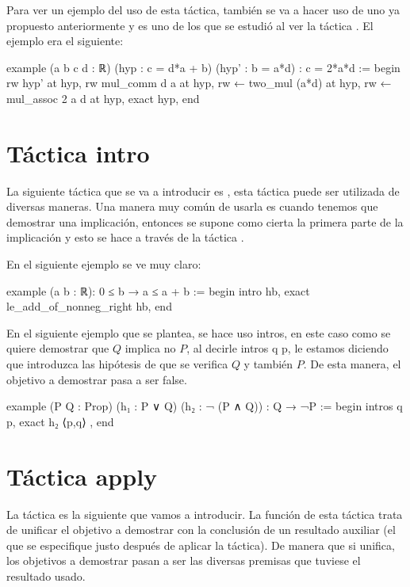 Para ver un ejemplo del uso de esta táctica, también se va a hacer uso de uno
ya propuesto anteriormente y es uno de los que se estudió al ver la táctica
. El ejemplo era el siguiente:

\begin{leancode}
example (a b c d : ℝ) (hyp : c = d*a + b) (hyp' : b = a*d) : c = 2*a*d :=
begin
  rw hyp' at hyp,
  rw mul_comm d a at hyp,
  rw ← two_mul (a*d) at hyp,
  rw ← mul_assoc 2 a d at hyp,
  exact hyp,
end
\end{leancode}


\section{Táctica intro}
La siguiente táctica que se va a introducir es ,
esta táctica puede ser utilizada de diversas maneras. Una manera muy común de
usarla es cuando tenemos que demostrar una implicación, entonces se supone
como cierta la primera parte de la implicación y esto se hace a través de la
táctica .

En el siguiente ejemplo se ve muy claro:

\begin{leancode}
example (a b : ℝ): 0 ≤ b → a ≤ a + b :=
begin
  intro hb,
  exact le_add_of_nonneg_right hb,
end
\end{leancode}

En el siguiente ejemplo que se plantea, se hace uso intros, en este caso como
se quiere demostrar que \(Q\) implica no \(P\), al decirle intros q p, le
estamos diciendo que introduzca las hipótesis de que se verifica \(Q\) y
también \(P\). De esta manera, el objetivo a demostrar pasa a ser false.
\begin{leancode}
example (P Q : Prop) (h₁ : P ∨ Q) (h₂ : ¬ (P ∧ Q)) : Q → ¬P :=
begin
  intros q p,
  exact h₂ ⟨p,q⟩ ,
end
\end{leancode}


\section{Táctica apply}
La táctica  es la siguiente que vamos a introducir. La
función de esta táctica trata de unificar el objetivo a demostrar con la
conclusión de un resultado auxiliar (el que se especifique justo después de
aplicar la táctica). De manera que si unifica, los objetivos a demostrar pasan
a ser las diversas premisas que tuviese el resultado usado.

